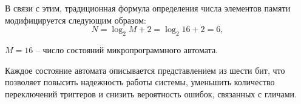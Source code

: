 В связи с этим, традиционная формула определения числа элементов памяти 
модифицируется следующим образом:
\begin{equation}
    N = \log_{2}{M} + 2 = \log_{2}{16} + 2 = 6,
\end{equation}

 $M = 16$ – число состояний микропрограммного автомата.  

Каждое состояние автомата описывается представлением из шести бит, 
что позволяет повысить надежность работы системы, уменьшить количество 
переключений триггеров и снизить вероятность ошибок, связанных с гличами.  




